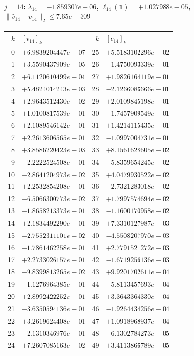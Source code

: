 \paragraph{$j = 14$: $\lambda_{14} = -1.859307e-06$, \quad $\ell_{14}(\mathbf{1}) = +1.027988e-05$, \quad $\|\hat{v}_{14} - v_{14}\|_2 \leq 7.65e-309$}
\begin{center}
{\footnotesize
\begin{tabular}{r@{\;\;}l@{\quad}r@{\;\;}l}
\toprule
$k$ & $[v_{14}]_k$ & $k$ & $[v_{14}]_k$ \\
\midrule
0 & $+6.9839204447e-07$ & 25 & $+5.5183102296e-02$ \\
1 & $+3.5590437909e-05$ & 26 & $-1.4750093339e-01$ \\
2 & $+6.1120610499e-04$ & 27 & $+1.9826164119e-01$ \\
3 & $+5.4824014243e-03$ & 28 & $-2.1266086666e-01$ \\
4 & $+2.9643512430e-02$ & 29 & $+2.0109845198e-01$ \\
5 & $+1.0100817539e-01$ & 30 & $-1.7457909549e-01$ \\
6 & $+2.1089546142e-01$ & 31 & $+1.4214115435e-01$ \\
7 & $+2.2613606565e-01$ & 32 & $-1.0997004731e-01$ \\
8 & $+3.8586220423e-03$ & 33 & $+8.1561628605e-02$ \\
9 & $-2.2222524508e-01$ & 34 & $-5.8359654245e-02$ \\
10 & $-2.8641204973e-02$ & 35 & $+4.0479930522e-02$ \\
11 & $+2.2532854208e-01$ & 36 & $-2.7321283018e-02$ \\
12 & $-6.5066300773e-02$ & 37 & $+1.7997574694e-02$ \\
13 & $-1.8658213373e-01$ & 38 & $-1.1600170958e-02$ \\
14 & $+2.1834492290e-01$ & 39 & $+7.3310127987e-03$ \\
15 & $-2.7552311101e-02$ & 40 & $-4.5508207970e-03$ \\
16 & $-1.7861462258e-01$ & 41 & $+2.7791521272e-03$ \\
17 & $+2.2733026157e-01$ & 42 & $-1.6719256136e-03$ \\
18 & $-9.8399813265e-02$ & 43 & $+9.9201702611e-04$ \\
19 & $-1.1276964385e-01$ & 44 & $-5.8113457693e-04$ \\
20 & $+2.8992422252e-01$ & 45 & $+3.3643364330e-04$ \\
21 & $-3.6350594136e-01$ & 46 & $-1.9264434256e-04$ \\
22 & $+3.2619624408e-01$ & 47 & $+1.0918968937e-04$ \\
23 & $-2.1310346976e-01$ & 48 & $-6.1302784273e-05$ \\
24 & $+7.2607085163e-02$ & 49 & $+3.4113866789e-05$ \\
\bottomrule
\end{tabular}
}
\end{center}


